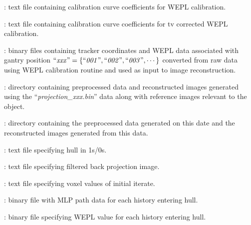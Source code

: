 \documentclass[landscape,12pt]{article}
\begin{document}
\begin{myEnumerate}[labelindent=1pt, leftmargin=*]
\begin{myEnumerate}[labelindent=1pt, leftmargin=*]
\begin{myEnumerate}[labelindent=1pt, leftmargin=*]
\begin{myEnumerate}[labelindent=1pt, leftmargin=*]
\begin{myEnumerate}[labelindent=1pt, leftmargin=*]
\begin{myEnumerate}[labelindent=1pt, leftmargin=*]
\begin{myEnumerate}[labelindent=1pt, leftmargin=*]
                                \item {} \color{Black}: text file containing calibration curve coefficients for WEPL calibration.
                                \item {} \color{Black}: text file containing calibration curve coefficients for tv corrected WEPL calibration.
                                \item {} \color{Black}: binary files containing tracker coordinates and WEPL data associated with gantry position $\textrm{``\textit{xxx}''} =\{\textrm{``\textit{001}''}, \textrm{``\textit{002}''}, \textrm{``\textit{003}''}, \cdots\}$ converted from raw data using WEPL calibration routine and used as input to image reconstruction.
                                \item {} \color{Black}: directory containing preprocessed data and reconstructed images generated using the ``\textit{projection\_xxx.bin}'' data along with reference images relevant to the object.
                                \begin{myEnumerate}[labelindent=1pt, leftmargin=*]
                                    \item {} \color{Black}: directory containing the preprocessed data generated on this date and the reconstructed images generated from this data.
                                    \begin{myEnumerate}[labelindent=1pt, leftmargin=*]
                                        \item {} \color{Black}: text file specifying hull in 1s/0s.
                                        \item {} \color{Black}: text file specifying filtered back projection image.
                                        \item {} \color{Black}: text file specifying voxel values of initial iterate.
                                        \item {} \color{Black}: binary file with MLP path data for each history entering hull.
                                        \item {} \color{Black}: binary file specifying WEPL value for each history entering hull.

\end{myEnumerate}
\end{myEnumerate}
\end{myEnumerate}
\end{myEnumerate}
\end{myEnumerate}
\end{myEnumerate}
\end{myEnumerate}
\end{myEnumerate}
\end{myEnumerate}
\end{document}
